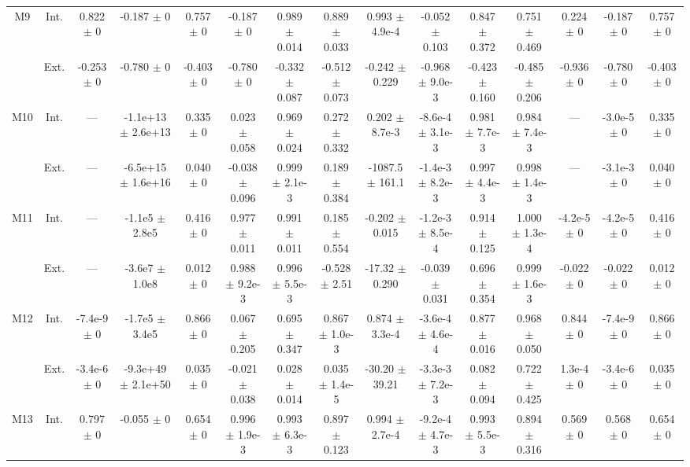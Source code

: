 \begin{table}[htbp]
{\begin{tabular}{@{}ccccccccccccccc@{}}
\cline{2-15}
\multirow{2}{*}{M9} & Int. & 0.822 $\pm$ 0 & -0.187 $\pm$ 0 & 0.757 $\pm$ 0 & -0.187 $\pm$ 0 & 0.989 $\pm$ 0.014 & 0.889 $\pm$ 0.033 & 0.993 $\pm$ 4.9e-4 & -0.052 $\pm$ 0.103 & 0.847 $\pm$ 0.372 & 0.751 $\pm$ 0.469 & 0.224 $\pm$ 0 & -0.187 $\pm$ 0 & 0.757 $\pm$ 0 \\
 & Ext. & -0.253 $\pm$ 0 & -0.780 $\pm$ 0 & -0.403 $\pm$ 0 & -0.780 $\pm$ 0 & -0.332 $\pm$ 0.087 & -0.512 $\pm$ 0.073 & -0.242 $\pm$ 0.229 & -0.968 $\pm$ 9.0e-3 & -0.423 $\pm$ 0.160 & -0.485 $\pm$ 0.206 & -0.936 $\pm$ 0 & -0.780 $\pm$ 0 & -0.403 $\pm$ 0 \\
\cline{2-15}
\multirow{2}{*}{M10} & Int. & --- & -1.1e+13 $\pm$ 2.6e+13 & 0.335 $\pm$ 0 & 0.023 $\pm$ 0.058 & 0.969 $\pm$ 0.024 & 0.272 $\pm$ 0.332 & 0.202 $\pm$ 8.7e-3 & -8.6e-4 $\pm$ 3.1e-3 & 0.981 $\pm$ 7.7e-3 & 0.984 $\pm$ 7.4e-3 & --- & -3.0e-5 $\pm$ 0 & 0.335 $\pm$ 0 \\
 & Ext. & --- & -6.5e+15 $\pm$ 1.6e+16 & 0.040 $\pm$ 0 & -0.038 $\pm$ 0.096 & 0.999 $\pm$ 2.1e-3 & 0.189 $\pm$ 0.384 & -1087.5 $\pm$ 161.1 & -1.4e-3 $\pm$ 8.2e-3 & 0.997 $\pm$ 4.4e-3 & 0.998 $\pm$ 1.4e-3 & --- & -3.1e-3 $\pm$ 0 & 0.040 $\pm$ 0 \\
\cline{2-15}
\multirow{2}{*}{M11} & Int. & --- & -1.1e5 $\pm$ 2.8e5 & 0.416 $\pm$ 0 & 0.977 $\pm$ 0.011 & 0.991 $\pm$ 0.011 & 0.185 $\pm$ 0.554 & -0.202 $\pm$ 0.015 & -1.2e-3 $\pm$ 8.5e-4 & 0.914 $\pm$ 0.125 & 1.000 $\pm$ 1.3e-4 & -4.2e-5 $\pm$ 0 & -4.2e-5 $\pm$ 0 & 0.416 $\pm$ 0 \\
 & Ext. & --- & -3.6e7 $\pm$ 1.0e8 & 0.012 $\pm$ 0 & 0.988 $\pm$ 9.2e-3 & 0.996 $\pm$ 5.5e-3 & -0.528 $\pm$ 2.51 & -17.32 $\pm$ 0.290 & -0.039 $\pm$ 0.031 & 0.696 $\pm$ 0.354 & 0.999 $\pm$ 1.6e-3 & -0.022 $\pm$ 0 & -0.022 $\pm$ 0 & 0.012 $\pm$ 0 \\
\cline{2-15}
\multirow{2}{*}{M12} & Int. & -7.4e-9 $\pm$ 0 & -1.7e5 $\pm$ 3.4e5 & 0.866 $\pm$ 0 & 0.067 $\pm$ 0.205 & 0.695 $\pm$ 0.347 & 0.867 $\pm$ 1.0e-3 & 0.874 $\pm$ 3.3e-4 & -3.6e-4 $\pm$ 4.6e-4 & 0.877 $\pm$ 0.016 & 0.968 $\pm$ 0.050 & 0.844 $\pm$ 0 & -7.4e-9 $\pm$ 0 & 0.866 $\pm$ 0 \\
 & Ext. & -3.4e-6 $\pm$ 0 & -9.3e+49 $\pm$ 2.1e+50 & 0.035 $\pm$ 0 & -0.021 $\pm$ 0.038 & 0.028 $\pm$ 0.014 & 0.035 $\pm$ 1.4e-5 & -30.20 $\pm$ 39.21 & -3.3e-3 $\pm$ 7.2e-3 & 0.082 $\pm$ 0.094 & 0.722 $\pm$ 0.425 & 1.3e-4 $\pm$ 0 & -3.4e-6 $\pm$ 0 & 0.035 $\pm$ 0 \\
\cline{2-15}
\multirow{2}{*}{M13} & Int. & 0.797 $\pm$ 0 & -0.055 $\pm$ 0 & 0.654 $\pm$ 0 & 0.996 $\pm$ 1.9e-3 & 0.993 $\pm$ 6.3e-3 & 0.897 $\pm$ 0.123 & 0.994 $\pm$ 2.7e-4 & -9.2e-4 $\pm$ 4.7e-3 & 0.993 $\pm$ 5.5e-3 & 0.894 $\pm$ 0.316 & 0.569 $\pm$ 0 & 0.568 $\pm$ 0 & 0.654 $\pm$ 0 \\

\end{tabular}}
\end{table}
